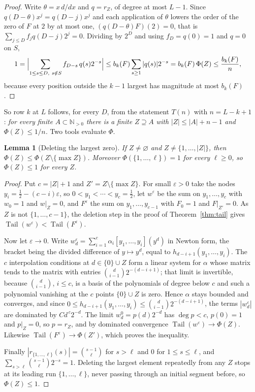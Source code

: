 \documentclass[11pt]{article}
\newtheorem{lemma}[theorem]{Lemma}
\newcommand{\N}{\mathbb N}
\DeclareMathOperator{\Tail}{Tail}
\begin{document}
\begin{proof}
Write $\theta=x\,d/dx$ and $q=r_Z$, of degree at most $L-1$.  Since
$q(D-\theta)x^j=q(D-j)x^j$ and each application of $\theta$ lowers the order
of the zero of $F$ at $2$ by at most one, $(q(D-\theta)F)(2)=0$, that is
$\sum_{j\le D}f_jq(D-j)2^{j}=0$.  Dividing by $2^D$ and using $f_D=q(0)=1$
and $q=0$ on $S$,
\[
  1=\Bigl|\sum_{1\le s\le D,\ s\notin S}f_{D-s}\,q(s)2^{-s}\Bigr|
   \le b_k(F)\sum_{s\ge1}|q(s)|2^{-s}=b_k(F)\,\Phi(Z)\le\frac{b_k(F)}n,
\]
because every position outside the $k-1$ largest has magnitude at most
$b_k(F)$.
\end{proof}

So row $k$ at $L$ follows, for every $D$, from the statement $T(n)$ with
$n=L-k+1$: \emph{for every finite $A\subset\N_{>0}$ there is a finite
$Z\supseteq A$ with $|Z|\le|A|+n-1$ and $\Phi(Z)\le1/n$.}  Two tools
evaluate $\Phi$.

\begin{lemma}[Deleting the largest zero]\label{lem:confdel}
If $Z\ne\varnothing$ and $Z\ne\{1,\ldots,|Z|\}$, then
$\Phi(Z)\le\Phi(Z\setminus\{\max Z\})$.  Moreover
$\Phi(\{1,\ldots,\ell\})=1$ for every $\ell\ge0$, so $\Phi(Z)\le1$ for every
$Z$.
\end{lemma}

\begin{proof}
Put $c=|Z|+1$ and $Z'=Z\setminus\{\max Z\}$.  For small $\varepsilon>0$ take
the nodes $y_i=\tfrac12-(c-i)\varepsilon$, so $0<y_1<\cdots<y_c=\tfrac12$,
let $w^\varepsilon$ be the sum on $y_1,\ldots,y_c$ with $w_0=1$ and
$w|_Z=0$, and $F^\varepsilon$ the sum on $y_1,\ldots,y_{c-1}$ with $F_0=1$
and $F|_{Z'}=0$.  As $Z$ is not $\{1,\ldots,c-1\}$, the deletion step in the
proof of Theorem~\ref{thm:tail} gives $\Tail(w^\varepsilon)<\Tail(F^\varepsilon)$.

Now let $\varepsilon\to0$.  Write $w^\varepsilon_d=\sum_{i=1}^c\alpha_i
[y_1,\ldots,y_i](y^d)$ in Newton form, the bracket being the divided
difference of $y\mapsto y^d$, equal to $h_{d-i+1}(y_1,\ldots,y_i)$.  The
$c$ interpolation conditions at $d\in\{0\}\cup Z$ form a linear system for
$\alpha$ whose matrix tends to the matrix with entries
$\binom d{i-1}2^{-(d-i+1)}$; that limit is invertible, because
$\binom d{i-1}$, $i\le c$, is a basis of the polynomials of degree below
$c$ and such a polynomial vanishing at the $c$ points $\{0\}\cup Z$ is zero.
Hence $\alpha$ stays bounded and converges, and since
$0\le h_{d-i+1}(y_1,\ldots,y_i)\le\binom d{i-1}2^{-(d-i+1)}$, the terms
$|w^\varepsilon_d|$ are dominated by $Cd^{\,c}2^{-d}$.  The limit
$w^0_d=p(d)2^{-d}$ has $\deg p<c$, $p(0)=1$ and $p|_Z=0$, so $p=r_Z$, and by
dominated convergence $\Tail(w^\varepsilon)\to\Phi(Z)$.  Likewise
$\Tail(F^\varepsilon)\to\Phi(Z')$, which proves the inequality.

Finally $|r_{\{1,\ldots,\ell\}}(s)|=\binom{s-1}\ell$ for $s>\ell$ and $0$ for
$1\le s\le\ell$, and $\sum_{s>\ell}\binom{s-1}\ell2^{-s}=1$.  Deleting the
largest element repeatedly from any $Z$ stops at its leading run
$\{1,\ldots,\ell\}$, never passing through an initial segment before, so
$\Phi(Z)\le1$.
\end{proof}
\end{document}
